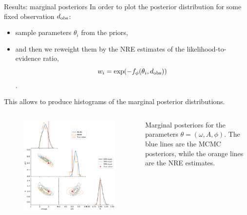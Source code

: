 \documentclass{beamer}
\begin{document}
\begin{frame}[allowframebreaks]{Results: marginal posteriors}
In order to plot the posterior distribution for some fixed observation $d_{\rm obs}$:
\begin{itemize}
    \item  sample parameters $\theta_i$ from the priors, 
    \item and then we reweight them by the NRE estimates of the likelihood-to-evidence ratio, 
    \[ w_i = \exp(-f_\phi(\theta_i, d_{\rm obs})) \].
\end{itemize}
This allows to produce histograms of the marginal posterior distributions.
\begin{columns}
    \begin{column}{0.7\textwidth}
        \begin{figure}
            \centering
            \includegraphics[height=0.8\textheight]{../figures/pairplot_mc_samples.pdf}
            \label{fig:marginal_posteriors}
        \end{figure}
    \end{column}
    \begin{column}{0.3\textwidth}
        Marginal posteriors for the parameters $\theta = (\omega, A, \phi)$. The blue lines are the MCMC posteriors, while the orange lines are the NRE estimates.
    \end{column}
\end{columns}
\end{frame}
\end{document}
